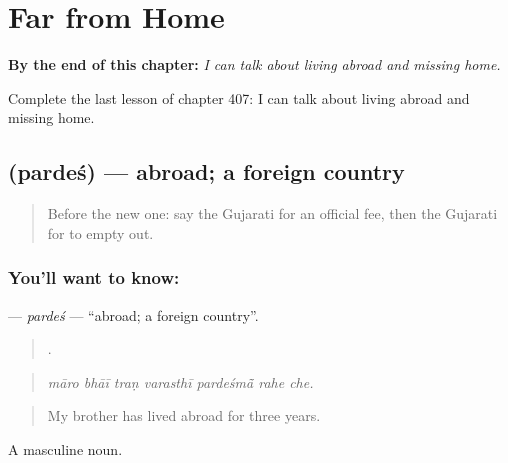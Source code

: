 
\chapter{Far from Home}
\label{ch:gu-far-from-home}

\begin{chapteropening}
\textbf{By the end of this chapter:} \emph{I can talk about living abroad and missing home.}

Complete the last lesson of chapter 407: I can talk about living abroad and missing home.
\end{chapteropening}

\section[\texorpdfstring{\gu{પરદેશ} (pardeś)}{પરદેશ (pardeś)}]{ (pardeś) — abroad; a foreign country}

\label{lesson:GU-C407-pardes}



\begin{quote}
Before the new one: say the Gujarati for an official fee, then the Gujarati for to empty out.
\end{quote}

\subsection*{You'll want to know: }
\textbf{} — \emph{pardeś} — \textquotedblleft{}abroad; a foreign country\textquotedblright{}.

\begin{quote}
      .
\end{quote}

\begin{quote}
\emph{māro bhāī traṇ varasthī pardeśmā̃ rahe che.}
\end{quote}

\begin{quote}
My brother has lived abroad for three years.
\end{quote}

A masculine noun.

